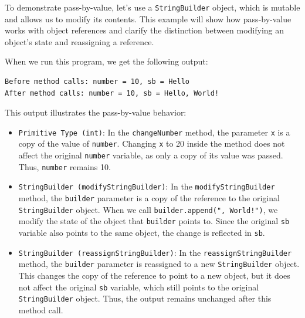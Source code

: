 \documentclass{article}
\begin{document}
To demonstrate pass-by-value, let’s use a \texttt{StringBuilder} object, which is mutable and allows us to modify its contents.
This example will show how pass-by-value works with object references and clarify the distinction between modifying an object’s state and reassigning a reference.



When we run this program, we get the following output:

\begin{verbatim}
Before method calls: number = 10, sb = Hello
After method calls: number = 10, sb = Hello, World!
\end{verbatim}
This output illustrates the pass-by-value behavior:
\begin{itemize}
	\item \texttt{Primitive Type (int)}: In the \texttt{changeNumber} method, the parameter \texttt{x} is a copy of the value of \texttt{number}. Changing \texttt{x} to 20 inside the method does not affect the original \texttt{number} variable, as only a copy of its value was passed. Thus, \texttt{number} remains 10.
	\item \texttt{StringBuilder (modifyStringBuilder)}: In the \texttt{modifyStringBuilder} method, the \texttt{builder} parameter is a copy of the reference to the original \texttt{StringBuilder} object. When we call \texttt{builder.append(", World!")}, we modify the state of the object that \texttt{builder} points to. Since the original \texttt{sb} variable also points to the same object, the change is reflected in \texttt{sb}.
	\item \texttt{StringBuilder (reassignStringBuilder)}: In the \texttt{reassignStringBuilder} method, the \texttt{builder} parameter is reassigned to a new \texttt{StringBuilder} object. This changes the copy of the reference to point to a new object, but it does not affect the original \texttt{sb} variable, which still points to the original \texttt{StringBuilder} object. Thus, the output remains unchanged after this method call.
\end{itemize}

\end{document}
